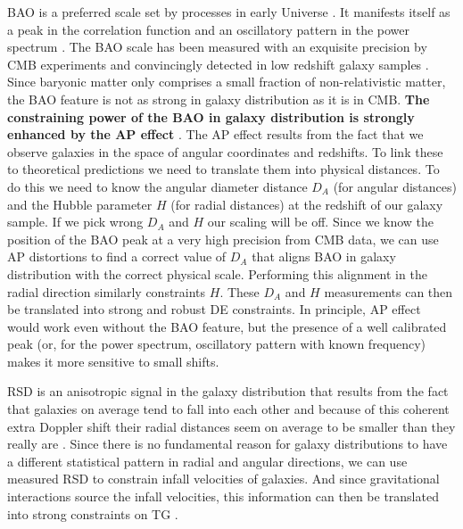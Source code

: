 BAO is a preferred scale set by processes in early Universe
\cite{1970ApJ...162..815P,1970Ap&SS...7....3S}. It manifests
itself as a peak in the correlation function and an oscillatory pattern in the
power spectrum \cite{1997Natur.386...37H,1998ApJ...496..605E}. The BAO scale has been measured with an exquisite precision by
CMB experiments and convincingly detected in low redshift galaxy samples
\cite{2005MNRAS.362..505C,2005ApJ...633..560E,2010MNRAS.401.2148P,2011MNRAS.416.3017B,2011MNRAS.418.1707B,2014JCAP...05..027F,2015A&A...574A..59D,2015MNRAS.449..835R}. Since
baryonic matter only comprises a small fraction of non-relativistic matter, the
BAO feature is not as strong in galaxy distribution as it is in CMB. \textbf{The
constraining power of the BAO in galaxy distribution is strongly enhanced by
the AP effect} \cite{1979Natur.281..358A}. The AP effect results from the fact that we observe galaxies in the space of
angular coordinates and redshifts. To link these  to theoretical  predictions
we need to translate them into physical distances. To do this we need to know
the angular diameter distance $D_A$ (for angular distances)  and the Hubble
parameter $H$ (for radial distances) at the redshift of our galaxy sample. If
we pick wrong $D_A$ and $H$ our scaling will be off. Since we know the
position of the BAO peak at a very high precision from CMB data, we can use AP
distortions to find a correct value of $D_A$ that aligns BAO in galaxy
distribution with the correct physical scale. Performing this alignment in the
radial direction similarly constraints $H$. These $D_A$ and $H$ measurements
can then be translated into strong and robust DE constraints. In principle, AP
effect would work even without the BAO feature, but the presence of a well
calibrated peak (or, for the power spectrum, oscillatory pattern with known
frequency) makes it more sensitive to small shifts.

RSD is an anisotropic signal in the galaxy distribution that results from the
fact that galaxies on average tend to fall into each other and because of this
coherent extra Doppler shift their radial distances seem on average to be
smaller than they really are \cite{1998ASSL..231..185H}. Since there is no
fundamental reason for galaxy distributions to have a different statistical
pattern in radial and angular directions, we can use measured RSD to constrain
infall velocities of galaxies. And since gravitational interactions source the
infall velocities, this information can then be translated into strong
constraints on TG
\cite{2013MNRAS.429.1514S,2015PhRvD..91f3008X,2016MNRAS.456.3743A}.

